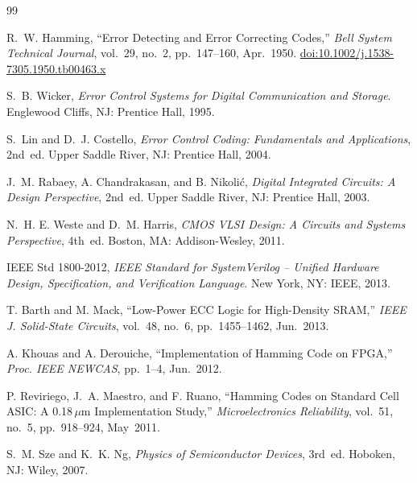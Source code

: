 \documentclass[12pt,a4paper]{article}
\begin{document}
\begin{thebibliography}{99}

  R.~W. Hamming,
  ``Error Detecting and Error Correcting Codes,''
  \textit{Bell System Technical Journal},
  vol.~29, no.~2, pp.~147--160, Apr.\ 1950.
  \href{https://doi.org/10.1002/j.1538-7305.1950.tb00463.x}{doi:10.1002/j.1538-7305.1950.tb00463.x}

  S.~B. Wicker,
  \textit{Error Control Systems for Digital Communication and Storage}.
  Englewood Cliffs, NJ: Prentice Hall, 1995.

  S.~Lin and D.~J. Costello,
  \textit{Error Control Coding: Fundamentals and Applications}, 2nd~ed.
  Upper Saddle River, NJ: Prentice Hall, 2004.

  J.~M. Rabaey, A. Chandrakasan, and B. Nikolić,
  \textit{Digital Integrated Circuits: A Design Perspective}, 2nd~ed.
  Upper Saddle River, NJ: Prentice Hall, 2003.

  N.~H. E. Weste and D.~M. Harris,
  \textit{CMOS VLSI Design: A Circuits and Systems Perspective}, 4th~ed.
  Boston, MA: Addison-Wesley, 2011.

  IEEE Std 1800-2012,
  \textit{IEEE Standard for SystemVerilog -- Unified Hardware Design, Specification, and Verification Language}.
  New York, NY: IEEE, 2013.

  T. Barth and M. Mack,
  ``Low-Power ECC Logic for High-Density SRAM,''
  \textit{IEEE J. Solid-State Circuits}, vol.~48, no.~6, pp.~1455--1462, Jun.\ 2013.

  A. Khouas and A. Derouiche,
  ``Implementation of Hamming Code on FPGA,''
  \textit{Proc. IEEE NEWCAS}, pp.~1--4, Jun.\ 2012.

  P. Reviriego, J.~A. Maestro, and F. Ruano,
  ``Hamming Codes on Standard Cell ASIC: A 0.18$\,\mu$m Implementation Study,''
  \textit{Microelectronics Reliability}, vol.~51, no.~5, pp.~918--924, May~2011.

  S.~M. Sze and K.~K. Ng,
  \textit{Physics of Semiconductor Devices}, 3rd~ed.
  Hoboken, NJ: Wiley, 2007.

\end{thebibliography}
\end{document}
